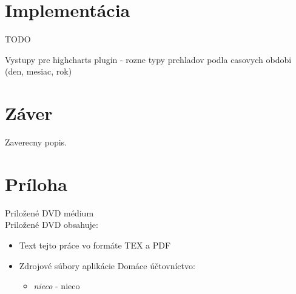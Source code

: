 \documentclass[12pt,onesided]{book}
\begin{document}
\chapter{Implementácia}
TODO

Vystupy pre highcharts plugin - rozne typy prehladov podla casovych obdobi (den, mesiac, rok)


\chapter{Záver}\label{chap:outro}
 
Zaverecny popis.

\backmatter

\nocite{*}




\newcommand{\dbappendix}[1]{\chapter{#1}}
\appendix
\dbappendix{Príloha}\label{appA}
{\large Priložené DVD médium}\\

Priložené DVD obsahuje:\\
\begin{itemize}
\item Text tejto práce vo formáte TEX a PDF
\item Zdrojové súbory aplikácie Domáce účtovníctvo:
	\begin{itemize}
		\item {\em nieco} - nieco
	\end{itemize}
\end{itemize}
\end{document}
